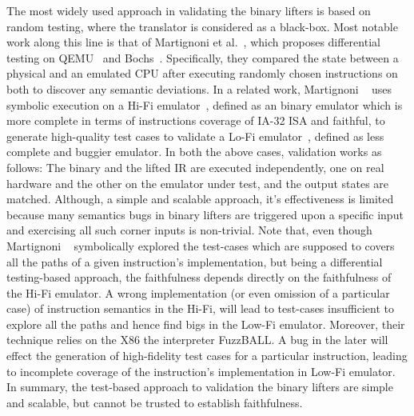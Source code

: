 The most widely used approach in validating the binary lifters is based on random testing, where the translator is considered as a black-box. Most notable work along this line  is that of Martignoni et al.~\cite{Martignoni:ISSTA2009, Martignoni:ISSTA2010}, which
 proposes differential testing on QEMU~\cite{QEMU:USENIX05} and Bochs~\cite{Bochs1996}.
Specifically, they compared the state between a physical and an emulated CPU
after executing randomly chosen instructions on both to discover any semantic
deviations. In a related work, Martignoni \etal~\cite{Martignoni:ASPLOS2012} uses symbolic execution on a Hi-Fi emulator~\cite{Bochs1996}, defined as an binary emulator which is more complete in terms of instructions coverage of IA-32 ISA and faithful, to generate high-quality test cases to validate  a Lo-Fi emulator~\cite{QEMU:USENIX05}, defined as  less complete and buggier emulator. In both the above cases, validation works as follows: The binary and the lifted IR are executed independently, one on real hardware and the other on the emulator under test, and the output states are matched. Although, a simple and scalable approach, it's effectiveness is limited because many semantics bugs in binary lifters are triggered upon a specific input and exercising all such corner inputs is non-trivial. Note that, even though Martignoni \etal~\cite{Martignoni:ASPLOS2012} symbolically explored the test-cases which are supposed to covers all the paths of a given instruction's implementation, but being a differential testing-based approach, the faithfulness depends directly on  the faithfulness of the Hi-Fi emulator. A wrong implementation (or even omission of a particular case) of instruction semantics in the Hi-Fi, will lead to test-cases insufficient to explore all the paths and hence find bigs in the Low-Fi emulator. Moreover, their technique relies on the X86 the interpreter FuzzBALL. A bug in the later will effect the generation of high-fidelity test cases for a particular instruction, leading to incomplete coverage of the instruction's implementation in Low-Fi emulator. In summary, the test-based approach to validation the binary lifters are simple and scalable, but cannot be trusted to establish faithfulness.     

